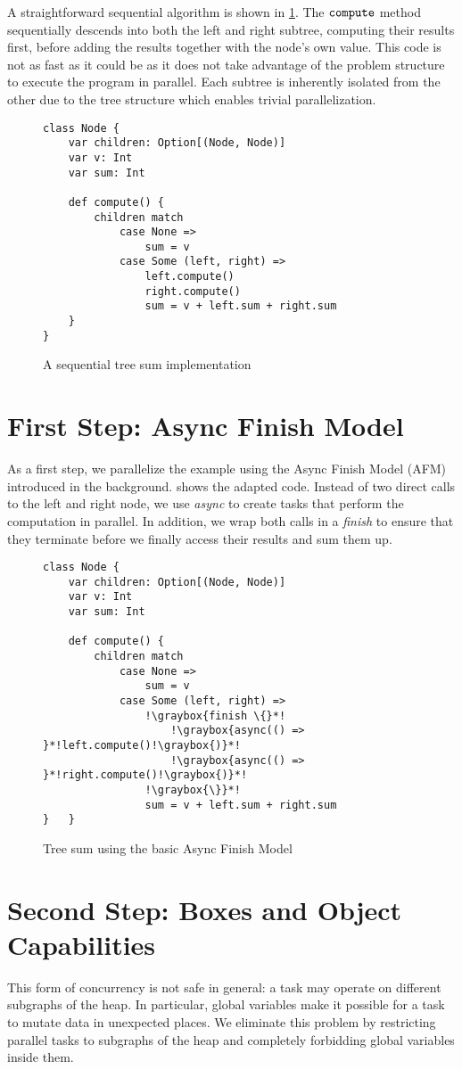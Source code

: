 A straightforward sequential algorithm is shown in \cref{fig:sum-1}. The $\texttt{compute}$ method sequentially descends into both the left and right subtree, computing their results first, before adding the results together with the node's own value. This code is not as fast as it could be as it does not take advantage of the problem structure to execute the program in parallel. Each subtree is inherently isolated from the other due to the tree structure which enables trivial parallelization.

\begin{figure}
\begin{lstlisting}
class Node {
	var children: Option[(Node, Node)]
	var v: Int
	var sum: Int

	def compute() {
		children match
			case None =>
				sum = v
			case Some (left, right) =>
				left.compute()
				right.compute()
				sum = v + left.sum + right.sum
	}
}
\end{lstlisting}
    \caption{A sequential tree sum implementation}
    \label{fig:sum-1}
\end{figure}

\section{First Step: Async Finish Model}
As a first step, we parallelize the example using the Async Finish Model (AFM) introduced in the background.  shows the adapted code. Instead of two direct calls to the left and right node, we use \textit{async} to create tasks that perform the computation in parallel. In addition, we wrap both calls in a \textit{finish} to ensure that they terminate before we finally access their results and sum them up.

\begin{figure}
\begin{lstlisting}
class Node {
	var children: Option[(Node, Node)]
	var v: Int
	var sum: Int

	def compute() {
		children match
			case None =>
				sum = v
			case Some (left, right) =>
				!\graybox{finish \{}*!
					!\graybox{async(() => }*!left.compute()!\graybox{)}*!
					!\graybox{async(() => }*!right.compute()!\graybox{)}*!
				!\graybox{\}}*!
				sum = v + left.sum + right.sum
}	}
\end{lstlisting}
    \caption{Tree sum using the basic Async Finish Model}
    \label{fig:sum-2}
\end{figure}

\section{Second Step: Boxes and Object Capabilities}
This form of concurrency is not safe in general: a task may operate on different subgraphs of the heap. In particular, global variables make it possible for a task to mutate data in unexpected places. We eliminate this problem by restricting parallel tasks to subgraphs of the heap and completely forbidding global variables inside them.

